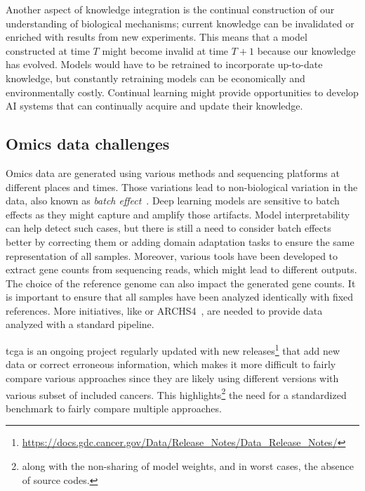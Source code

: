 \documentclass[../main.tex]{subfiles}
\begin{document}
		Another aspect of knowledge integration is the continual construction of our understanding of biological mechanisms; current knowledge can be invalidated or enriched with results from new experiments.
		This means that a model constructed at time \(T\) might become invalid at time \(T+1\) because our knowledge has evolved.
		Models would have to be retrained to incorporate up-to-date knowledge, but constantly retraining models can be economically and environmentally costly.
		Continual learning might provide opportunities to develop AI systems that can continually acquire and update their knowledge\cite{wang2024comprehensivesurveycontinuallearning}.

	\subsection{Omics data challenges}
		Omics data are generated using various methods and sequencing platforms at different places and times.
		Those variations lead to non-biological variation in the data, also known as \emph{batch effect}~\cite{Leek2010}.
		Deep learning models are sensitive to batch effects as they might capture and amplify those artifacts.
		Model interpretability can help detect such cases, but there is still a need to consider batch effects better by correcting them or adding domain adaptation tasks to ensure the same representation of all samples.
		Moreover, various tools have been developed to extract gene counts from sequencing reads, which might lead to different outputs.
		The choice of the reference genome can also impact the generated gene counts.
		It is important to ensure that all samples have been analyzed identically with fixed references.
		More initiatives, like  or ARCHS4~\cite{Lachmann2018}, are needed to provide data analyzed with a standard pipeline.

		\Gls{tcga} is an ongoing project regularly updated with new releases\footnote{\url{https://docs.gdc.cancer.gov/Data/Release_Notes/Data_Release_Notes/}} that add new data or correct erroneous information, which makes it more difficult to fairly compare various approaches since they are likely using different versions with various subset of included cancers.
		This highlights\footnote{along with the non-sharing of model weights, and in worst cases, the absence of source codes.} the need for a standardized benchmark to fairly compare multiple approaches.
\end{document}
